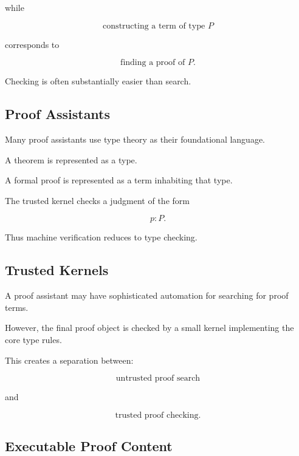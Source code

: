 while

\[
\boxed{
\text{constructing a term of type }P
}
\]

corresponds to

\[
\boxed{
\text{finding a proof of }P.
}
\]

Checking is often substantially easier than search.

\subsection{Proof Assistants}
\label{subsec:type-theory-proof-assistants}

Many proof assistants use type theory as their foundational language.

A theorem is represented as a type.

A formal proof is represented as a term inhabiting that type.

The trusted kernel checks a judgment of the form

\[
\boxed{
p:P.
}
\]

Thus machine verification reduces to type checking.

\subsection{Trusted Kernels}
\label{subsec:type-theory-trusted-kernels}

A proof assistant may have sophisticated automation for searching for proof
terms.

However, the final proof object is checked by a small kernel implementing
the core type rules.

This creates a separation between:

\[
\boxed{
\text{untrusted proof search}
}
\]

and

\[
\boxed{
\text{trusted proof checking}.
}
\]

\subsection{Executable Proof Content}
\label{subsec:executable-proof-content}

